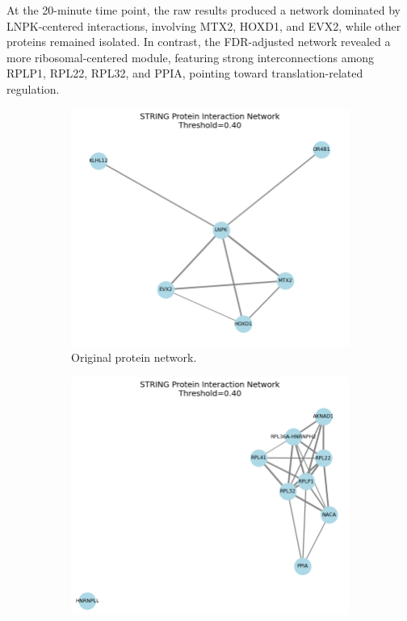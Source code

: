 \documentclass{article}
\begin{document}
      At the 20-minute time point, the raw results produced a network dominated by LNPK-centered interactions, involving MTX2, HOXD1, and EVX2, while other proteins remained isolated. In contrast, the FDR-adjusted network revealed a more ribosomal-centered module, featuring strong interconnections among RPLP1, RPL22, RPL32, and PPIA, pointing toward translation-related regulation.

      \begin{figure}[H]
        \centering
        \begin{subfigure}{0.45\textwidth}
            \includegraphics[width=\linewidth]{figures/protein_network_20min.png}
            \caption{Original protein network.}
            \label{fig:protein_network_20min}
        \end{subfigure}
        \hfill
        \begin{subfigure}{0.45\textwidth}
            \includegraphics[width=\linewidth]{figures/protein_network_fdr_20min.png}

\end{subfigure}
\end{figure}
\end{document}
